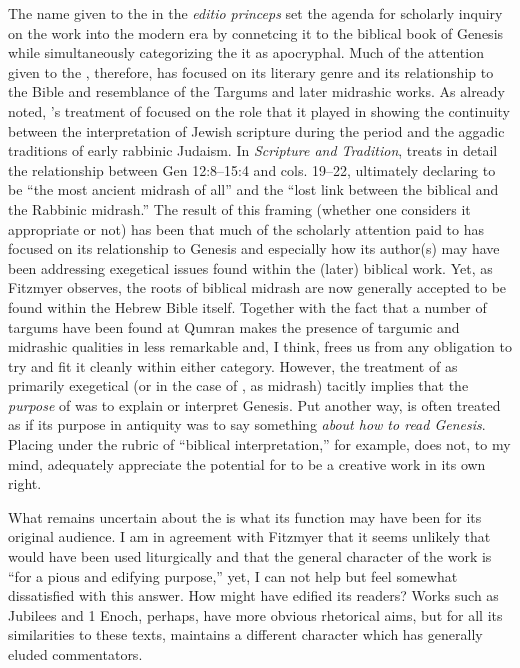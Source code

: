 The name given to the \ga in the \emph{editio princeps} set the agenda for scholarly inquiry on the work into the modern era by connetcing it to the biblical book of Genesis while simultaneously categorizing the it as apocryphal. Much of the attention given to the \ga, therefore, has focused on its literary genre and its relationship to the Bible and resemblance of the Targums and later midrashic works. As already noted, \vermes's treatment of \ga focused on the role that it played in showing the continuity between the interpretation of Jewish scripture during the \secondtemple period and the aggadic traditions of early rabbinic Judaism. In \emph{Scripture and Tradition}, \vermes treats in detail the relationship between Gen 12:8--15:4 and \ga cols. 19--22, ultimately declaring \ga to be ``the most ancient midrash of all'' and the ``lost link between the biblical and the Rabbinic midrash.''\autocite[124]{vermes1961} The result of this framing (whether one considers it appropriate or not) has been that much of the scholarly attention paid to \ga has focused on its relationship to Genesis and especially how its author(s) may have been addressing exegetical issues found within the (later) biblical work. Yet, as Fitzmyer observes, the roots of biblical midrash are now generally accepted to be found within the Hebrew Bible itself. Together with the fact that a number of targums have been found at Qumran makes the presence of targumic and midrashic qualities in \ga less remarkable and, I think, frees us from any obligation to try and fit it cleanly within either category.\autocite[20]{fitzmyer2004} However, the treatment of \ga as primarily exegetical (or in the case of \vermes, as midrash) tacitly implies that the \emph{purpose} of \ga was to explain or interpret Genesis. Put another way, \ga is often treated as if its purpose in antiquity was to say something \emph{about how to read Genesis}. Placing \ga under the rubric of ``biblical interpretation,'' for example, does not, to my mind, adequately appreciate the potential for \ga to be a creative work in its own right.

What remains uncertain about the \ga is what its function may have been for its original audience. I am in agreement with Fitzmyer that it seems unlikely that \ga would have been used liturgically and that the general character of the work is ``for a pious and edifying purpose,''\autocite[20]{fitzmyer2004} yet, I can not help but feel somewhat dissatisfied with this answer. How might \ga have edified its readers? Works such as Jubilees and 1 Enoch, perhaps, have more obvious rhetorical aims, but for all its similarities to these texts, \ga maintains a different character which has generally eluded commentators.

